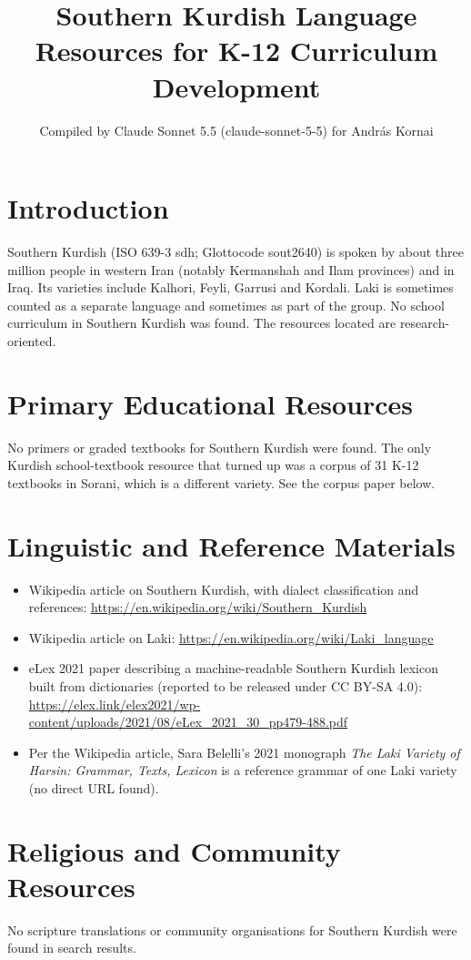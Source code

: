 \documentclass[12pt]{article}
\title{Southern Kurdish Language Resources for K-12 Curriculum Development}
\author{Compiled by Claude Sonnet 5.5 (claude-sonnet-5-5) for Andr\'as Kornai}
\date{}
\begin{document}
\maketitle

\section{Introduction}
Southern Kurdish (ISO 639-3 sdh; Glottocode sout2640) is spoken by about three million people in western Iran (notably Kermanshah and Ilam provinces) and in Iraq. Its varieties include Kalhori, Feyli, Garrusi and Kordali. Laki is sometimes counted as a separate language and sometimes as part of the group. No school curriculum in Southern Kurdish was found. The resources located are research-oriented.

\section{Primary Educational Resources}
No primers or graded textbooks for Southern Kurdish were found. The only Kurdish school-textbook resource that turned up was a corpus of 31 K-12 textbooks in Sorani, which is a different variety. See the corpus paper below.

\section{Linguistic and Reference Materials}
\begin{itemize}
\item Wikipedia article on Southern Kurdish, with dialect classification and references: \url{https://en.wikipedia.org/wiki/Southern_Kurdish}
\item Wikipedia article on Laki: \url{https://en.wikipedia.org/wiki/Laki_language}
\item eLex 2021 paper describing a machine-readable Southern Kurdish lexicon built from dictionaries (reported to be released under CC BY-SA 4.0): \url{https://elex.link/elex2021/wp-content/uploads/2021/08/eLex_2021_30_pp479-488.pdf}
\item Per the Wikipedia article, Sara Belelli's 2021 monograph \emph{The Laki Variety of Harsin: Grammar, Texts, Lexicon} is a reference grammar of one Laki variety (no direct URL found).
\end{itemize}

\section{Religious and Community Resources}
No scripture translations or community organisations for Southern Kurdish were found in search results.
\end{document}
